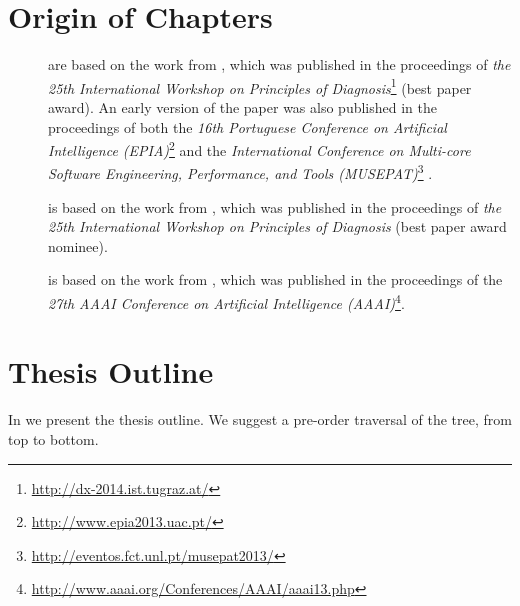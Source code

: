 \section{Origin of Chapters}
\label{sec:intro:origin-of-chapters}
\begin{description}
\item [] are
  based on the work from \citep{Cardoso14a}, which was published in
  the proceedings of \textit{the 25th International Workshop on
    Principles of
    Diagnosis}\footnote{\url{http://dx-2014.ist.tugraz.at/}} (best
  paper award). An early version of the paper was also published in
  the proceedings of both the \textit{16th Portuguese Conference on
    Artificial Intelligence
    (EPIA)}\footnote{\url{http://www.epia2013.uac.pt/}}
  \citep{Cardoso13b} and the \textit{International Conference on
    Multi-core Software Engineering, Performance, and Tools
    (MUSEPAT)}\footnote{\url{http://eventos.fct.unl.pt/musepat2013/}}
  \citep{Cardoso13c}.

\item [] is based on the work from
  \citep{Cardoso14b}, which was published in the proceedings of
  \textit{the 25th International Workshop on Principles of Diagnosis}
  (best paper award nominee).

\item [] is based on the work from \citep{Cardoso13a},
  which was published in the proceedings of the \textit{27th AAAI
    Conference on Artificial Intelligence
    (AAAI)}\footnote{\url{http://www.aaai.org/Conferences/AAAI/aaai13.php}}.
\end{description}

\section{Thesis Outline}
\label{sec:intro:outline}
In  we present the thesis outline.
%
We suggest a pre-order traversal of the tree, from top to bottom.
%





